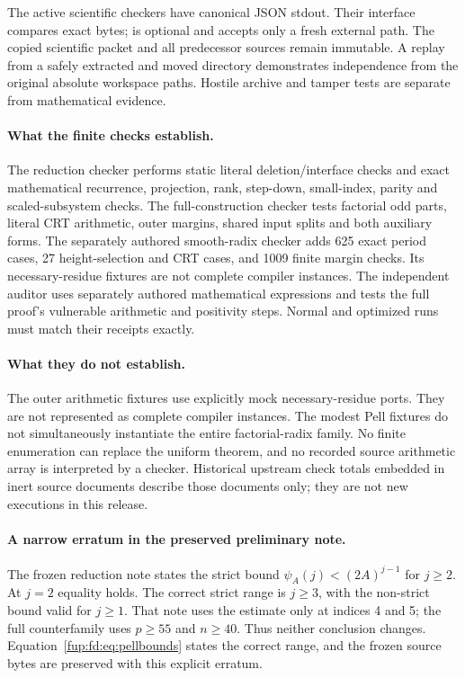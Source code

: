 \documentclass[11pt,letterpaper]{article}
\theoremstyle{definition}\newtheorem{definition}[theorem]{Definition}
\theoremstyle{remark}\newtheorem{remark}[theorem]{Remark}
\newcommand{\code}[1]{\texttt{\detokenize{#1}}}
\begin{document}
The active scientific checkers have canonical JSON stdout. Their \code{--expect} interface compares exact bytes; \code{--output} is optional and accepts only a fresh external path. The copied scientific packet and all predecessor sources remain immutable. A replay from a safely extracted and moved directory demonstrates independence from the original absolute workspace paths. Hostile archive and tamper tests are separate from mathematical evidence.

\paragraph{What the finite checks establish.}
The reduction checker performs static literal deletion/interface checks and exact mathematical recurrence, projection, rank, step-down, small-index, parity and scaled-subsystem checks. The full-construction checker tests factorial odd parts, literal CRT arithmetic, outer margins, shared input splits and both auxiliary forms. The separately authored smooth-radix checker adds 625 exact period cases, 27 height-selection and CRT cases, and 1009 finite margin checks. Its necessary-residue fixtures are not complete compiler instances. The independent auditor uses separately authored mathematical expressions and tests the full proof's vulnerable arithmetic and positivity steps. Normal and optimized runs must match their receipts exactly.

\paragraph{What they do not establish.}
The outer arithmetic fixtures use explicitly mock necessary-residue ports. They are not represented as complete compiler instances. The modest Pell fixtures do not simultaneously instantiate the entire factorial-radix family. No finite enumeration can replace the uniform theorem, and no recorded source arithmetic array is interpreted by a checker. Historical upstream check totals embedded in inert source documents describe those documents only; they are not new executions in this release.

\paragraph{A narrow erratum in the preserved preliminary note.}
The frozen reduction note \code{PROOF.md} states the strict bound $\psi_A(j)<(2A)^{j-1}$ for $j\ge2$. At $j=2$ equality holds. The correct strict range is $j\ge3$, with the non-strict bound valid for $j\ge1$. That note uses the estimate only at indices 4 and 5; the full counterfamily uses $p\ge55$ and $n\ge40$. Thus neither conclusion changes. Equation~\eqref{fup:fd:eq:pellbounds} states the correct range, and the frozen source bytes are preserved with this explicit erratum.
\end{document}
